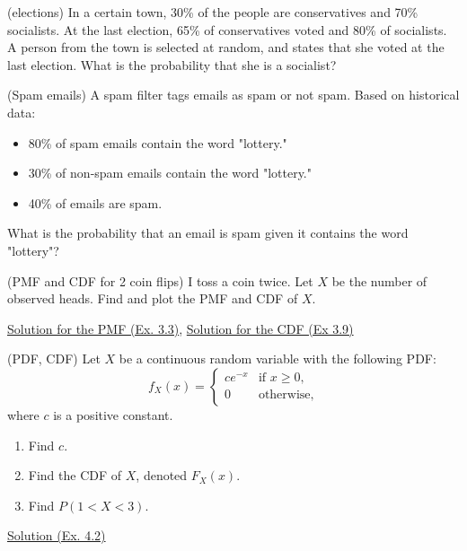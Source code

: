 \begin{problem} (elections)
In a certain town, 30\% of the people are conservatives and 70\% socialists. At the last election, 65\% of conservatives voted and 80\% of socialists. A person from the town is selected at random, and states that she voted at the last election. What is
the probability that she is a socialist?
\end{problem}

\begin{problem} (Spam emails)
        A spam filter tags emails as spam or not spam. Based on historical data:
    \begin{itemize}
        \item 80\% of spam emails contain the word "lottery."
        \item 30\% of non-spam emails contain the word "lottery."
        \item 40\% of emails are spam.
    \end{itemize}
    
    What is the probability that an email is spam given it contains the word "lottery"?
\end{problem}
\begin{problem} (PMF and CDF for 2 coin flips)
    I toss a coin twice. Let $X$  be the number of observed heads. Find and plot the PMF and CDF of $X$.

\href{https://www.probabilitycourse.com/chapter3/3_1_3_pmf.php}{Solution for the PMF (Ex. 3.3)}, \href{https://www.probabilitycourse.com/chapter3/3_2_1_cdf.php}{Solution for the CDF (Ex 3.9)}
\end{problem}
\begin{problem} (PDF, CDF)
    Let \( X \) be a continuous random variable with the following PDF:
    \[
    f_X(x) =
    \begin{cases} 
    c e^{-x} & \text{if } x \geq 0, \\
    0 & \text{otherwise,}
    \end{cases}
    \]
    where \( c \) is a positive constant.
    
    \begin{enumerate}
        \item Find \( c \).
        \item Find the CDF of \( X \), denoted \( F_X(x) \).
        \item Find \( P(1 < X < 3) \).
    \end{enumerate}
\href{https://www.probabilitycourse.com/chapter4/4_1_1_pdf.php}{Solution (Ex. 4.2)}
\end{problem}


